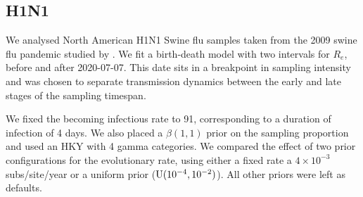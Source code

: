 \documentclass{article}
\begin{document}
\subsection*{H1N1}
We analysed North American H1N1 Swine flu samples taken from the 2009 swine flu pandemic studied by \citet{hedge_2013_real-time}. We fit a birth-death model with two intervals for $R_e$, before and after 2020-07-07. This date sits in a breakpoint in sampling intensity and was chosen to separate transmission dynamics between the early and late stages of the sampling timespan.

We fixed the becoming infectious rate to 91, corresponding to a duration of infection of 4 days. We also placed a $\beta(1, 1)$ prior on the sampling proportion and used an HKY with 4 gamma categories. We compared the effect of two prior configurations for the evolutionary rate, using either a fixed rate a $4\times10^{-3}$ subs/site/year or a uniform prior ($\textnormal{U}(10^{-4}, 10^{-2})$). All other priors were left as defaults.


\renewcommand{\thefigure}{S\arabic{figure}}
\setcounter{figure}{0}
\end{document}
